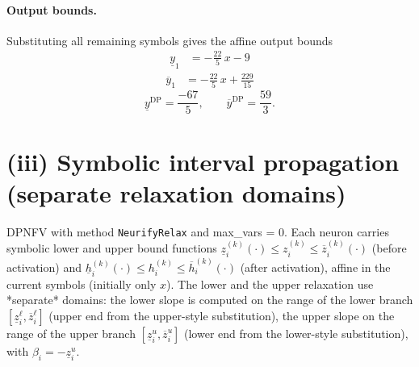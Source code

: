 \documentclass[11pt]{article}
\begin{document}
\paragraph{Output bounds.}
Substituting all remaining symbols gives the affine output bounds
\begin{align*}
\underline{y}_{1} &= -\frac{22}{5}\,x - 9
\end{align*}
\begin{align*}
\overline{y}_{1} &= -\frac{22}{5}\,x + \frac{229}{15}
\end{align*}
\begin{equation*}
\underline{y}^{\text{DP}} = \frac{-67}{5}, \qquad \overline{y}^{\text{DP}} = \frac{59}{3}.
\end{equation*}

\section{(iii) Symbolic interval propagation (separate relaxation domains)}
DPNFV with method \texttt{NeurifyRelax} and max\_vars = 0. Each neuron carries symbolic lower and upper bound functions
$\underline{z}^{(k)}_i(\cdot) \le z^{(k)}_i \le \overline{z}^{(k)}_i(\cdot)$ (before activation)
and $\underline{h}^{(k)}_i(\cdot) \le h^{(k)}_i \le \overline{h}^{(k)}_i(\cdot)$ (after activation),
affine in the current symbols (initially only $x$).
The lower and the upper relaxation use *separate* domains:
the lower slope is computed on the range of the lower branch
$[\underline{z}^{\ell}_i, \overline{z}^{\ell}_i]$ (upper end from the upper-style substitution),
the upper slope on the range of the upper branch
$[\underline{z}^{u}_i, \overline{z}^{u}_i]$ (lower end from the lower-style substitution),
with $\beta_i = -\underline{z}^{u}_i$.
\end{document}
